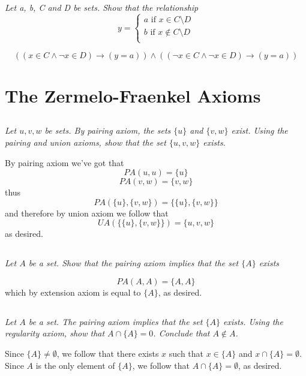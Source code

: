 \documentclass[11pt,oneside,titlepage]{book}
\begin{document}
\subsection{}

\textit{Let a, b, C and D be sets. Show that the relationship}
$$y =
\begin{cases}
  a \text{ if } x \in C \setminus D \\
  b \text{ if } x \notin C \setminus D \\
\end{cases}
$$

$$((x \in C \land \neg x \in D) \to (y = a)) \land ((\neg x \in C \land \neg x \in D) \to (y = a))$$


\section{The Zermelo-Fraenkel Axioms}

\subsection{}

\textit{Let $u, v, w$ be sets. By pairing axiom, the sets $\{u\}$ and $\{v, w\}$
  exist. Using the pairing and union axioms, show that the set $\{u, v, w\}$
  exists.}

By pairing axiom we've got that
$$PA(u, u) = \{u\}$$
$$PA(v, w) = \{v, w\}$$
thus
$$PA(\{u\}, \{v, w\}) = \{\{u\}, \{v, w\}\}$$
and therefore by union axiom we follow that
$$UA(\{\{u\}, \{v, w\}\}) = \{u, v, w\}$$
as desired.

\subsection{}

\textit{Let $A$ be a set. Show that the pairing axiom implies that the set $\{A\}$ exists}

$$PA(A, A) = \{A, A\}$$
which by extension axiom is equal to $\{A\}$, as desired.

\subsection{}

\textit{Let $A$ be a set. The pairing axiom implies that the set $\{A\}$ exists. Using the
  regularity axiom, show that $A \cap \{A\} = 0$. Conclude that $A \notin A$.}

Since $\{A\} \neq \emptyset$, we follow that there exists $x$ such that $x \in \{A\}$ and
$x \cap \{A\} = \emptyset$. Since $A$ is the only element of $\{A\}$, we follow that
$A \cap \{A\} = \emptyset$, as desired.
\end{document}
